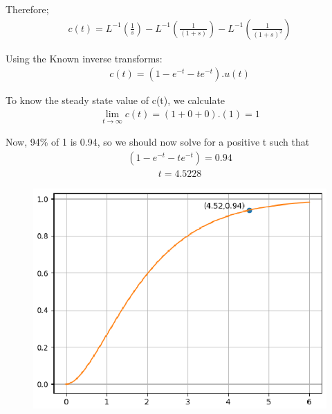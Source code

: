 
Therefore;
\begin{multline}
c(t) = L^{-1} ( \frac{1}{s}) - L^{-1}(\frac{1}{(1+s)}) - L^{-1}(\frac{1}{(1+s)^2}) 
\end{multline}

Using the Known inverse transforms:
\begin{multline}
c(t) = (1 - e^{-t} - te^{-t}) . u(t)
\end{multline}



To know the steady state value of c(t), we calculate 
\begin{multline}
\lim_{t\to\infty} c(t) = (1+0+0).(1) = 1
\end{multline}

Now, 94\% of 1 is 0.94, so we should now solve for a positive t such that
\begin{multline}
(1 - e^{-t} - te^{-t}) = 0.94
\end{multline}
\begin{multline}
 t = 4.5228
\end{multline}
\begin{figure}
\includegraphics[width=\columnwidth]{./figs/ee18btech11002.eps}

\end{figure}
%

